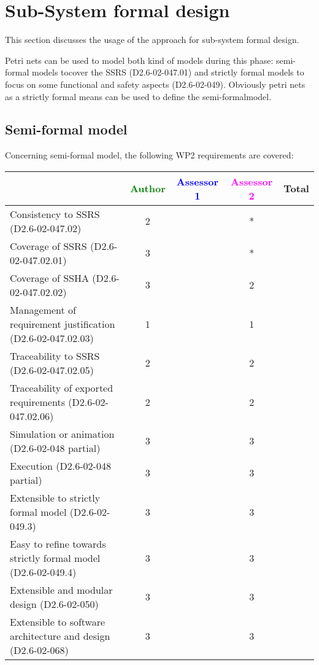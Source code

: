 \section{Sub-System formal design}
This section discusses the usage of the approach for sub-system formal design.

Petri nets can be used to model both kind of models during this phase: semi-formal models tocover the SSRS (D2.6-02-047.01) and strictly formal  models to  focus on some functional and safety aspects (D2.6-02-049).  Obviously petri nets as a strictly  formal means can be used to define the semi-formalmodel.

\subsection{Semi-formal model}

Concerning semi-formal model, the following WP2 requirements are covered:

\begin{tabular}{|l | c | c | c | c|}
\hline
& \textcolor{green}{Author} & \textcolor{blue}{Assessor 1} & \textcolor{magenta}{Assessor 2} & Total \\
\hline 
Consistency to SSRS (D2.6-02-047.02) & 2 & & * &  \\
\hline
Coverage of SSRS (D2.6-02-047.02.01)  & 3 & & * &  \\
\hline
Coverage of SSHA (D2.6-02-047.02.02)  & 3 & & 2 &  \\
\hline
Management of requirement justification (D2.6-02-047.02.03)  & 1 & & 1 &  \\
\hline
Traceability to  SSRS (D2.6-02-047.02.05)  & 2 & & 2 &  \\
\hline
Traceability of exported requirements (D2.6-02-047.02.06)  & 2 & & 2 &  \\
\hline
Simulation or animation (D2.6-02-048 partial)  & 3 & & 3 &  \\
\hline
Execution (D2.6-02-048 partial)  & 3 & & 3 &  \\
\hline
Extensible to strictly formal model (D2.6-02-049.3) & 3 & & 3 &  \\
\hline
Easy to  refine towards strictly formal model (D2.6-02-049.4) & 3 & & 3 &  \\
\hline
Extensible and modular design (D2.6-02-050)  & 3 & & 3 &  \\
\hline
Extensible to software architecture and design (D2.6-02-068)   & 3 & & 3 &  \\
\hline
\end{tabular}

